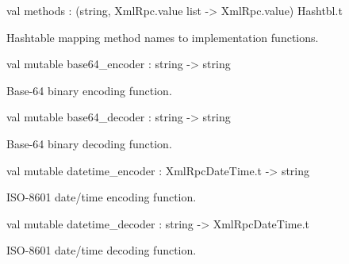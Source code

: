\documentclass[11pt]{article}
\begin{document}
\begin{ocamldocobjectend}


\label{val:XmlRpcServer.base.methods}\begin{ocamldoccode}
val methods : (string, XmlRpc.value list -> XmlRpc.value) Hashtbl.t
\end{ocamldoccode}
\begin{ocamldocdescription}
Hashtable mapping method names to implementation functions.


\end{ocamldocdescription}


\label{val:XmlRpcServer.base.base64-underscoreencoder}\begin{ocamldoccode}
val mutable base64_encoder : string -> string
\end{ocamldoccode}
\begin{ocamldocdescription}
Base-64 binary encoding function.


\end{ocamldocdescription}


\label{val:XmlRpcServer.base.base64-underscoredecoder}\begin{ocamldoccode}
val mutable base64_decoder : string -> string
\end{ocamldoccode}
\begin{ocamldocdescription}
Base-64 binary decoding function.


\end{ocamldocdescription}


\label{val:XmlRpcServer.base.datetime-underscoreencoder}\begin{ocamldoccode}
val mutable datetime_encoder : XmlRpcDateTime.t -> string
\end{ocamldoccode}
\begin{ocamldocdescription}
ISO-8601 date/time encoding function.


\end{ocamldocdescription}


\label{val:XmlRpcServer.base.datetime-underscoredecoder}\begin{ocamldoccode}
val mutable datetime_decoder : string -> XmlRpcDateTime.t
\end{ocamldoccode}
\begin{ocamldocdescription}
ISO-8601 date/time decoding function.



\end{ocamldocdescription}
\end{ocamldocobjectend}
\end{document}
